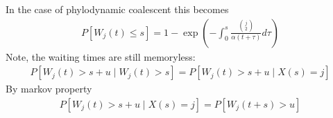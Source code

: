 \documentclass{report}
\theoremstyle{definition}
\begin{document}
In the case of phylodynamic coalescent this becomes
\begin{gather}
P[W_j(t) \leq s] = 1 - \exp(-\int_0^{s}\frac{\binom{j}{2}}{\alpha(t+\tau)}d\tau)
\end{gather}
Note, the waiting times are still memoryless:
\begin{gather}
P\left[W_j(t) > s+u\mid W_j(t)>s \right] = P\left[W_j(t) > s+u\mid X(s)=j\right]
\end{gather}
By markov property
\begin{gather}
P\left[W_j(t) > s+u\mid X(s)=j\right] = P\left[W_j(t+s) > u\right]
\end{gather}
\end{document}
